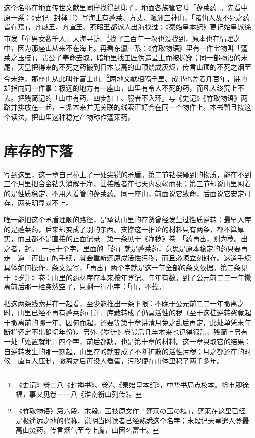 这个名称在地面传世文献里同样找得到印子，地面各族管它叫「蓬莱药」。先看中原一系：《史记·封禅书》写海上有蓬莱、方丈、瀛洲三神山，「诸仙人及不死之药皆在焉」，齐威王、齐宣王、燕昭王都派人出海找过；《秦始皇本纪》更记始皇派徐市发「童男女数千人」入海寻访。\footnote{《史记》卷二八《封禅书》、卷六《秦始皇本纪》，中华书局点校本。徐市即徐福，事又见卷一一八《淮南衡山列传》。}找了三百年一次也没找到，原本也在情理之中，因为那座山从来不在海上。再看东瀛一系：《竹取物语》里有一件宝物叫「蓬莱之玉枝」，贵公子奉命去取，暗地里找工匠伪造呈上而被拆穿；同一部物语的末尾，天皇把得来的不死之药搬到日本最高的山顶烧成灰烬，传言山顶的不死之烟至今未绝，那座山从此叫作富士山。\footnote{《竹取物语》第六段、末段。玉枝原文作「蓬莱の玉の枝」，蓬莱在这里已经是极遥远之地的代称，说明当时读者已经熟悉这个名字；末段记天皇遣人登最高山焚药，传言烟气至今上腾，山因名富士。}两地文献相隔千里、成书也差着几百年，讲的却指向同一件事：极远的地方有一座山，山里有令人不死的药，而凡人终究上不去。把残简记的「山中有药、四步加工、服者不入环」与《史记》《竹取物语》两路并排放在一起，三条本来并无关联的线索正好合在同一个物件上。本书暂且按这个读法，把山里这种稳定产物称作蓬莱药。

\section{库存的下落}

写到这里，这一章自己撞上了一处尖锐的矛盾。第二节钻探碰到的物质，能在不到三个月里把合金钻头消解干净、让接触者在七天内衰竭而死；第三节却说山里囤着的是性质稳定、不用人看管的蓬莱药。同一座山，前面说它致命，后面说它安定可存，两头明显对不上。

唯一能把这个矛盾理顺的路径，是承认山里的存货曾经发生过性质逆转：最早入库的是蓬莱药，后来却变成了别的东西。支撑这一推论的材料只有两条，都不算厚实，而且都不是直接的正面记录。第一条见于《净秽》卷：「药再出，则为秽。出之者，封。」一共十个字，里面的「药」就是蓬莱药，意思是原本稳定的药只要再走一道「再出」的手续，就会重新还原成活性污秽，而且必须立刻封存。这道手续具体如何操作，条文没写，「再出」两个字就是这一节全部的条文依据。第二条见于《岁计》卷：山里的药材库存本来按年登记、年年有数，到了公元前二二一年撤离前后那一栏突然空了，只剩一行小字：「山，不载。」

把这两条线索并在一起看，至少能推出一条下限：不晚于公元前二二一年撤离之时，山里已经不再有蓬莱药可计，库藏转成了仍具活性的秽（至于这桩逆转究竟起于撤离前的哪一年、因何而起，还要等第十章讲清月兔之乱后再定，此处单凭末年断栏还定不出确切年份）。另外《岁计》卷最后几年本来也记得很乱，残简上另有一处「处置就地」四个字，前后都缺，也是第十章的材料。这一章只取它的结果：自逆转发生的那一刻起，山里存的就变成了不断扩散的活性污秽；月之都还在的时候一直有人压制，撤离之后再没人看管，污秽便在山体里积了两千多年。

